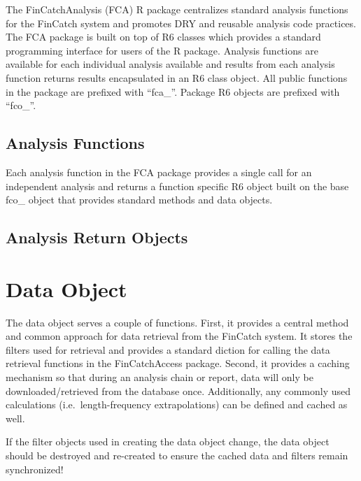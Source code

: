 \documentclass[
  letterpaper,
  DIV=11,
  numbers=noendperiod]{scrreprt}
\begin{document}

The FinCatchAnalysis (FCA) R package centralizes standard analysis
functions for the FinCatch system and promotes DRY and reusable analysis
code practices. The FCA package is built on top of R6 classes which
provides a standard programming interface for users of the R package.
Analysis functions are available for each individual analysis available
and results from each analysis function returns results encapsulated in
an R6 class object. All public functions in the package are prefixed
with ``fca\_''. Package R6 objects are prefixed with ``fco\_''.

\section{Analysis Functions}\label{analysis-functions}

Each analysis function in the FCA package provides a single call for an
independent analysis and returns a function specific R6 object built on
the base fco\_ object that provides standard methods and data objects.

\section{Analysis Return Objects}\label{analysis-return-objects}

\chapter{Data Object}\label{data-object}

The data object serves a couple of functions. First, it provides a
central method and common approach for data retrieval from the FinCatch
system. It stores the filters used for retrieval and provides a standard
diction for calling the data retrieval functions in the FinCatchAccess
package. Second, it provides a caching mechanism so that during an
analysis chain or report, data will only be downloaded/retrieved from
the database once. Additionally, any commonly used calculations
(i.e.~length-frequency extrapolations) can be defined and cached as
well.

\begin{tcolorbox}[enhanced jigsaw, leftrule=.75mm, coltitle=black, colbacktitle=quarto-callout-warning-color!10!white, colframe=quarto-callout-warning-color-frame, opacitybacktitle=0.6, rightrule=.15mm, colback=white, bottomtitle=1mm, toptitle=1mm, titlerule=0mm, breakable, bottomrule=.15mm, toprule=.15mm, title=\textcolor{quarto-callout-warning-color}{\faExclamationTriangle}\hspace{0.5em}{Warning}, arc=.35mm, opacityback=0, left=2mm]

If the filter objects used in creating the data object change, the data
object should be destroyed and re-created to ensure the cached data and
filters remain synchronized!

\end{tcolorbox}
\end{document}
